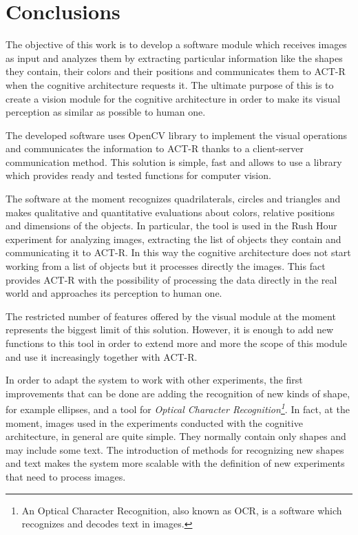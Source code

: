 \chapter{Conclusions}
	The objective of this work is to develop a software module which receives images as input and analyzes them by extracting particular information like the shapes they contain, their colors and their positions and communicates them to \mbox{ACT-R} when the cognitive architecture requests it. 
	The ultimate purpose of this is to create a vision module for the cognitive architecture in order to make its visual perception as similar as possible to human one.
	

	The developed software uses \mbox{OpenCV} library to implement the visual operations and communicates the information to \mbox{ACT-R} thanks to a client-server communication method. 
	This solution is simple, fast and allows to use a library which provides ready and tested functions for computer vision.  


	The software at the moment recognizes quadrilaterals, circles and triangles and makes qualitative and quantitative evaluations about colors, relative positions and dimensions of the objects. 
	In particular, the tool is used in the Rush Hour experiment for analyzing images, extracting the list of objects they contain and communicating it to \mbox{ACT-R}. 
	In this way the cognitive architecture does not start working from a list of objects but it processes directly the images.
	This fact provides \mbox{ACT-R} with the possibility of processing the data directly in the real world and approaches its perception to human one. 	
		

	The restricted number of features offered by the visual module at the moment represents the biggest limit of this solution.
	However, it is enough to add new functions to this tool in order to extend more and more the scope of this module and use it increasingly together with \mbox{ACT-R}.


	In order to adapt the system to work with other experiments, the first improvements that can be done are adding the recognition of new kinds of shape, for example ellipses, and a tool for \emph{{Optical Character Recognition\footnote{An Optical Character Recognition, also known as OCR, is a software which recognizes and decodes text in images.}}}.
	In fact, at the moment, images used in the experiments conducted with the cognitive architecture, in general are quite simple.
	They normally contain only shapes and may include some text.
	The introduction of methods for recognizing new shapes and text makes the system more scalable with the definition  of new experiments that need to process images.



